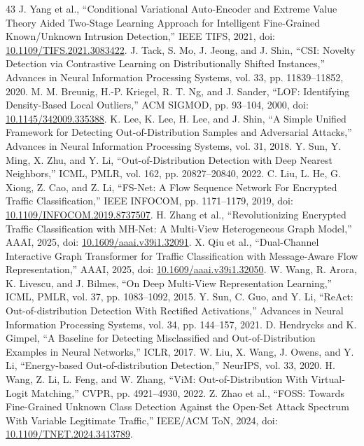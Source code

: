 \documentclass[journal]{IEEEtran}
\begin{document}
\begin{thebibliography}{43}
 J. Yang et al., ``Conditional Variational Auto-Encoder and Extreme Value Theory Aided Two-Stage Learning Approach for Intelligent Fine-Grained Known/Unknown Intrusion Detection,'' IEEE TIFS, 2021, doi: \url{10.1109/TIFS.2021.3083422}.
 J. Tack, S. Mo, J. Jeong, and J. Shin, ``CSI: Novelty Detection via Contrastive Learning on Distributionally Shifted Instances,'' Advances in Neural Information Processing Systems, vol. 33, pp. 11839--11852, 2020.
 M. M. Breunig, H.-P. Kriegel, R. T. Ng, and J. Sander, ``LOF: Identifying Density-Based Local Outliers,'' ACM SIGMOD, pp. 93--104, 2000, doi: \url{10.1145/342009.335388}.
 K. Lee, K. Lee, H. Lee, and J. Shin, ``A Simple Unified Framework for Detecting Out-of-Distribution Samples and Adversarial Attacks,'' Advances in Neural Information Processing Systems, vol. 31, 2018.
 Y. Sun, Y. Ming, X. Zhu, and Y. Li, ``Out-of-Distribution Detection with Deep Nearest Neighbors,'' ICML, PMLR, vol. 162, pp. 20827--20840, 2022.
 C. Liu, L. He, G. Xiong, Z. Cao, and Z. Li, ``FS-Net: A Flow Sequence Network For Encrypted Traffic Classification,'' IEEE INFOCOM, pp. 1171--1179, 2019, doi: \url{10.1109/INFOCOM.2019.8737507}.
 H. Zhang et al., ``Revolutionizing Encrypted Traffic Classification with MH-Net: A Multi-View Heterogeneous Graph Model,'' AAAI, 2025, doi: \url{10.1609/aaai.v39i1.32091}.
 X. Qiu et al., ``Dual-Channel Interactive Graph Transformer for Traffic Classification with Message-Aware Flow Representation,'' AAAI, 2025, doi: \url{10.1609/aaai.v39i1.32050}.
 W. Wang, R. Arora, K. Livescu, and J. Bilmes, ``On Deep Multi-View Representation Learning,'' ICML, PMLR, vol. 37, pp. 1083--1092, 2015.
 Y. Sun, C. Guo, and Y. Li, ``ReAct: Out-of-distribution Detection With Rectified Activations,'' Advances in Neural Information Processing Systems, vol. 34, pp. 144--157, 2021.
 D. Hendrycks and K. Gimpel, ``A Baseline for Detecting Misclassified and Out-of-Distribution Examples in Neural Networks,'' ICLR, 2017.
 W. Liu, X. Wang, J. Owens, and Y. Li, ``Energy-based Out-of-distribution Detection,'' NeurIPS, vol. 33, 2020.
 H. Wang, Z. Li, L. Feng, and W. Zhang, ``ViM: Out-of-Distribution With Virtual-Logit Matching,'' CVPR, pp. 4921--4930, 2022.
 Z. Zhao et al., ``FOSS: Towards Fine-Grained Unknown Class Detection Against the Open-Set Attack Spectrum With Variable Legitimate Traffic,'' IEEE/ACM ToN, 2024, doi: \url{10.1109/TNET.2024.3413789}.

\end{thebibliography}
\end{document}
